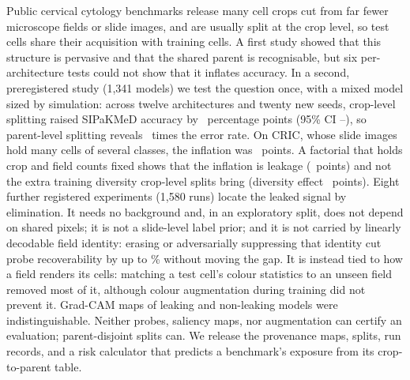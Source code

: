 Public cervical cytology benchmarks release many cell crops cut from far fewer microscope
fields or slide images, and are usually split at the crop level, so test cells share their
acquisition with training cells. A first study showed that this structure is pervasive and that
the shared parent is recognisable, but six per-architecture tests could not show that it inflates
accuracy. In a second, preregistered study (1,341 models) we test the question once, with a
mixed model sized by simulation: across twelve architectures and twenty new seeds, crop-level
splitting raised SIPaKMeD accuracy by \HoneEst\ percentage points (95\% CI \HoneBootLo--\HoneBootHi),
so parent-level splitting reveals \SipErrorRatio\ times the error rate. On CRIC, whose slide
images hold many cells of several classes, the inflation was \HtwoEst\ points. A factorial
that holds crop and field counts fixed shows that the inflation is leakage (\HthreeEst\ points)
and not the extra training diversity crop-level splits bring (diversity effect \DivEst\ points). Eight further registered
experiments (1,580 runs) locate the leaked signal by elimination. It needs no background and,
in an exploratory split, does not depend on shared pixels; it is not a slide-level label prior; and it is not carried by
linearly decodable field identity: erasing or adversarially suppressing that identity cut probe
recoverability by up to \RecoveryCutMax\% without moving the gap. It is instead tied to how a
field renders its cells: matching a test cell's colour statistics to an unseen field removed
most of it, although colour augmentation during training did not prevent it. Grad-CAM maps of
leaking and non-leaking models were indistinguishable. Neither probes, saliency maps, nor
augmentation can certify an evaluation; parent-disjoint splits can. We release the provenance
maps, splits, run records, and a risk calculator that predicts a benchmark's exposure from its
crop-to-parent table.
